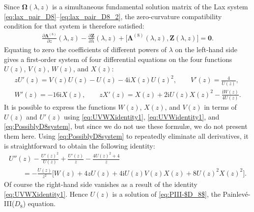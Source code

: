 \documentclass[pdftex]{sigma}
\numberwithin{equation}{section}
\newcommand{\ii}{\mathrm{i}}
\begin{document}
Since $\mathbf{\Omega}(\lambda,z)$ is a simultaneous fundamental solution matrix of the Lax system \eqref{eq:lax_pair_D8}--\eqref{eq:lax_pair_D8_2}, the zero-curvature compatibility condition for that system is therefore satisfied:
\begin{gather*}
 \frac{\partial\mathbf{\Lambda}^{(8)}}{\partial z}(\lambda,z)-\frac{\partial\mathbf{Z}}{\partial\lambda}(\lambda,z)+\big[\mathbf{\Lambda}^{(8)}(\lambda,z),\mathbf{Z}(\lambda,z)\big]=\mathbf{0}.
\end{gather*}
Equating to zero the coefficients of different powers of $\lambda$ on the left-hand side gives a first-order system of four differential equations on the four functions $U(z)$, $V(z)$, $W(z)$, and $X(z)$:
\begin{gather}
 zU'(z)=V(z)U(z)-U(z)-4\ii X(z)U(z)^2,\qquad
 V'(z)=\frac{4}{U(z)},\nonumber\\
 W'(z)=-16\ii X(z),\qquad
 zX'(z)=X(z)+2\ii U(z)X(z)^2-\frac{\ii W(z)}{4U(z)}.
 \label{eq:PossiblyD8system}
\end{gather}
It is possible to express the functions $W(z)$, $X(z)$, and $V(z)$ in terms of $U(z)$ and $U'(z)$ using \eqref{eq:UVWXidentity1}, \eqref{eq:UVWidentity1}, and \eqref{eq:PossiblyD8system}, but since we do not use these formul\ae, we do not present them here. Using \eqref{eq:PossiblyD8system} to repeatedly eliminate all derivatives, it is straightforward to obtain the following identity:
\begin{gather*}
 U''(z)-\frac{U'(z)^2}{U(z)}+\frac{U'(z)}{z} -\frac{4U(z)^2+4}{z}\\
 \qquad=-\frac{U(z)}{z^2}\big[ W(z)+4 z U(z) +4 \ii U(z) V(z) X(z) + 8 U(z)^2 X(z)^2\big].
\end{gather*}
Of course the right-hand side vanishes as a result of the identity \eqref{eq:UVWXidentity1}. Hence $U(z)$ is a solution of \eqref{eq:PIII-$D_8$}, the Painlev\'e-III($D_8$) equation.
\end{document}

